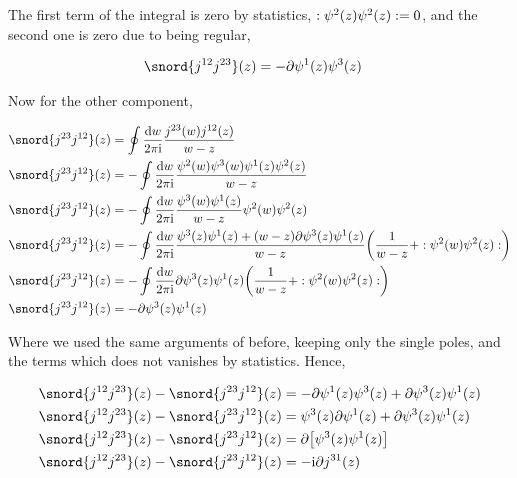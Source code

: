 The first term of the integral is zero by statistics, $:\psi^2\qty(z)\psi^2\qty(z):=0$, and the second one is zero due to being regular,

\begin{align*}
    \snord{j^{12}j^{23}}\qty(z)&=-\partial\psi^1\qty(z)\psi^3\qty(z)
\end{align*}

Now for the other component,

\begin{align*}
    \snord{j^{23}j^{12}}\qty(z)&=\oint\frac{\dd{w}}{2\pi\im}\frac{j^{23}\qty(w)j^{12}\qty(z)}{w-z}\\
    \snord{j^{23}j^{12}}\qty(z)&=-\oint\frac{\dd{w}}{2\pi\im}\frac{\psi^2\qty(w)\psi^3\qty(w)\psi^1\qty(z)\psi^2\qty(z)}{w-z}\\
    \snord{j^{23}j^{12}}\qty(z)&=-\oint\frac{\dd{w}}{2\pi\im}\frac{\psi^3\qty(w)\psi^1\qty(z)}{w-z}\psi^2\qty(w)\psi^2\qty(z)\\
    \snord{j^{23}j^{12}}\qty(z)&=-\oint\frac{\dd{w}}{2\pi\im}\frac{\psi^3\qty(z)\psi^1\qty(z)+\qty(w-z)\partial\psi^3\qty(z)\psi^1\qty(z)}{w-z}\qty(\frac{1}{w-z}+\cnord{\psi^2\qty(w)\psi^2\qty(z)})\\
    \snord{j^{23}j^{12}}\qty(z)&=-\oint\frac{\dd{w}}{2\pi\im}\partial\psi^3\qty(z)\psi^1\qty(z)\qty(\frac{1}{w-z}+\cnord{\psi^2\qty(w)\psi^2\qty(z)})\\
    \snord{j^{23}j^{12}}\qty(z)&=-\partial\psi^3\qty(z)\psi^1\qty(z)
\end{align*}

Where we used the same arguments of before, keeping only the single poles, and the terms which does not vanishes by statistics. Hence,

\begin{align*}
    \snord{j^{12}j^{23}}\qty(z)-\snord{j^{23}j^{12}}\qty(z)&=-\partial\psi^1\qty(z)\psi^3\qty(z)+\partial\psi^3\qty(z)\psi^1\qty(z)\\
    \snord{j^{12}j^{23}}\qty(z)-\snord{j^{23}j^{12}}\qty(z)&=\psi^3\qty(z)\partial\psi^1\qty(z)+\partial\psi^3\qty(z)\psi^1\qty(z)\\
    \snord{j^{12}j^{23}}\qty(z)-\snord{j^{23}j^{12}}\qty(z)&=\partial\qty[\psi^3\qty(z)\psi^1\qty(z)]\\
    \snord{j^{12}j^{23}}\qty(z)-\snord{j^{23}j^{12}}\qty(z)&=-\im\partial j^{31}\qty(z)
\end{align*}